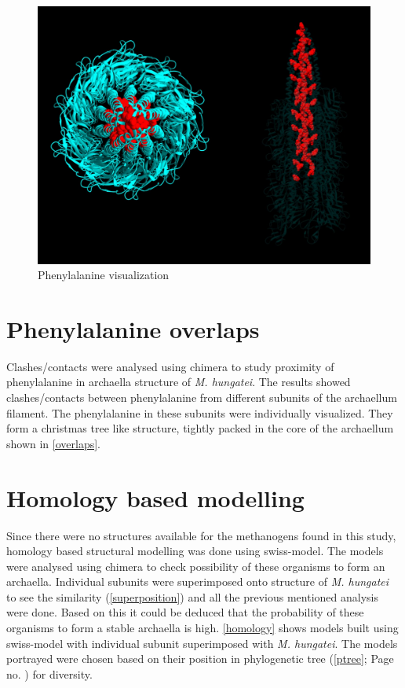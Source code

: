 \documentclass[fontsize=12pt,headsepline=true, bibliography=totocnumbered, twoside]{scrbook} %
\begin{document}
\begin{figure}[h]
\center
\includegraphics[width=0.85\linewidth]{overlap}
\caption{Phenylalanine visualization}
\label{overlaps}
\end{figure}


\section{Phenylalanine overlaps}

Clashes/contacts were analysed using chimera to study proximity of phenylalanine in archaella structure of \textit{M. hungatei}. The results showed clashes/contacts between phenylalanine from different subunits of the archaellum filament. The phenylalanine in these subunits were individually visualized. They form a christmas tree like structure, tightly packed in the core of the archaellum shown in \autoref{overlaps}. 



\clearpage

\section{Homology based modelling}

Since there were no structures available for the methanogens found in this study, homology based structural modelling was done using swiss-model. The models were analysed using chimera to check possibility of these organisms to form an archaella. Individual subunits were superimposed onto structure of \textit{M. hungatei} to see the similarity (\autoref{superposition}) and all the previous mentioned analysis were done. Based on this it could be deduced that the probability of these organisms to form a stable archaella is high. \autoref{homology} shows models built using swiss-model with individual subunit superimposed with \textit{M. hungatei}. The models portrayed were chosen based on their position in phylogenetic tree (\autoref{ptree}; Page no. \pageref{ptree}) for diversity.
\end{document}

